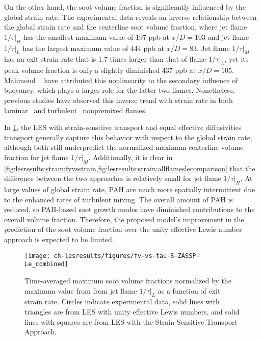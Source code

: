 On the other hand, the soot volume fraction is significantly influenced by the global strain rate. The experimental data reveals an inverse relationship between the global strain rate and the centerline soot volume fraction, where jet flame $1/\tau|_H$ has the smallest maximum value of 197 ppb at $x/D = 103$ and jet flame $1/\tau|_L$ has the largest maximum value of 444 ppb at $x/D = 83$. Jet flame $1/\tau|_M$ has an exit strain rate that is 1.7 times larger than that of flame $1/\tau|_L$, yet its peak volume fraction is only a slightly diminished 437 ppb at $x/D = 105$. Mahmoud \etal~\cite{mahmoud2017} have attributed this nonlinearity to the secondary influence of buoyancy, which plays a larger role for the latter two flames. Nonetheless, previous studies have observed this inverse trend with strain rate in both laminar~\cite{decroix2000,huijnen2010,wang2016433} and turbulent~\cite{kent1984,mahmoud2017} nonpremixed flames.

In \cref{fig:lesresults:strain:fvvsstrain}, the LES with strain-sensitive transport and equal effective diffusivities transport generally capture this behavior with respect to the global strain rate, although both still underpredict the normalized maximum centerline volume fraction for jet flame $1/\tau|_M$. Additionally, it is clear in \cref{fig:lesresults:strain:fvvsstrain,fig:lesresults:strain:allflameslecomparison} that the difference between the two approaches is relatively small for jet flame $1/\tau|_H$. At large values of global strain rate, PAH are much more spatially intermittent due to the enhanced rates of turbulent mixing. The overall amount of PAH is reduced, so PAH-based soot growth modes have diminished contributions to the overall volume fraction. Therefore, the proposed model's improvement in the prediction of the soot volume fraction over the unity effective Lewis number approach is expected to be limited.


\begin{figure}[htb]
  \centering
  \texttt{[image: ch-lesresults/figures/fv-vs-tau-S-ZASSP-Le\_combined]}
  \caption[Normalized Maximum $\langle f_V \rangle$ Versus Exit Strain Rate]{Time-averaged maximum soot volume fractions normalized by the maximum value from from jet flame $1/\tau|_L$ as a function of exit strain rate. Circles indicate experimental data, solid lines with triangles are from LES with unity effective Lewis numbers, and solid lines with squares are from LES with the Strain-Sensitive Transport Approach.}
  \label{fig:lesresults:strain:fvvsstrain}
\end{figure}

